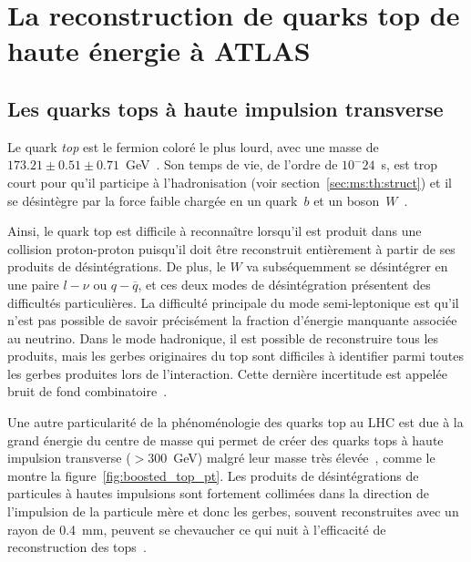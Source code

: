 \singlespacing{}
\chapter{La reconstruction de quarks top de haute énergie à ATLAS}
\label{sec:top}
\doublespacing{}

\section{Les quarks tops à haute impulsion transverse}
\label{sec:top:boosted}

Le quark \emph{top} est le fermion coloré le plus lourd, avec une
masse de $173.21\pm0.51\pm0.71$~GeV~\cite{olive_review_2014}. Son
temps de vie, de l'ordre de $10^-{24}$~s, est trop court pour qu'il
participe à l'hadronisation (voir section~\ref{sec:ms:th:struct})
et il se désintègre par la force faible chargée en un quark~$b$ et un
boson~$W$~\cite{olive_top_2014}.

Ainsi, le quark top est difficile à reconnaître lorsqu'il est produit
dans une collision proton-proton puisqu'il doit être reconstruit
entièrement à partir de ses produits de désintégrations. De plus, le
$W$ va subséquemment se désintégrer en une paire $l-\nu$ ou
$q-\overline{q}$, et ces deux modes de désintégration présentent des
difficultés particulières. La difficulté principale du mode
semi-leptonique est qu'il n'est pas possible de savoir précisément la
fraction d'énergie manquante associée au neutrino. Dans le mode
hadronique, il est possible de reconstruire tous les produits, mais
les gerbes originaires du top sont difficiles à identifier parmi toutes
les gerbes produites lors de l'interaction. Cette dernière incertitude
est appelée bruit de fond combinatoire~\cite{bandyopadhyay_boosted_2011}.

Une autre particularité de la phénoménologie des quarks top au LHC est
due à la grand énergie du centre de masse qui permet de créer des
quarks tops à haute impulsion transverse ($>300$~GeV) malgré leur
masse très élevée~\cite{atlas_collaboration_measurement_2015}, comme
le montre la figure~\ref{fig:boosted_top_pt}.  Les produits de
désintégrations de particules à hautes impulsions sont fortement
collimées dans la direction de l'impulsion de la particule mère et donc
les gerbes, souvent reconstruites avec un rayon de 0.4~mm, peuvent se
chevaucher ce qui nuit à l'efficacité de reconstruction des
tops~\cite{_identification_2015}.

